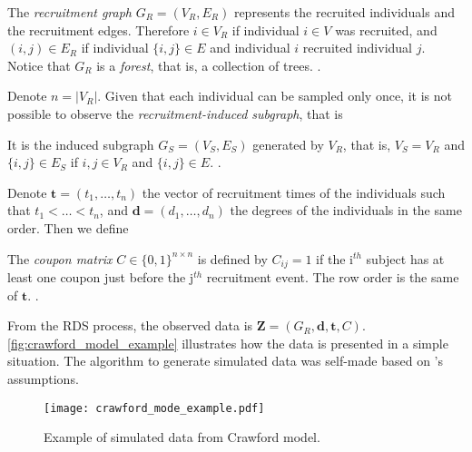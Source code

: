 \begin{definition}
  \label{def:recruitment-graph}
  The {\em recruitment graph} $G_R = (V_R, E_R)$ represents the recruited
  individuals and the recruitment edges. Therefore $i \in V_R$ if individual
  $i \in V$ was recruited, and $(i,j) \in E_R$ if individual $\{i,j\} \in E$ 
  and individual $i$ recruited individual $j$. Notice that $G_R$ is a {\em
  forest}, that is, a collection of trees. \cite[p. 193]{crawford2016}.
\end{definition}

Denote $n = |V_R|$. Given that each individual can be sampled only once, it is not possible to
observe the {\em recruitment-induced subgraph}, that is

\begin{definition}
  It is the induced subgraph $G_S = (V_S, E_S)$ generated by $V_R$, that is,
  $V_S = V_R$ and $\{i,j\} \in E_S$ if $i, j \in V_R$ and $\{i, j\} \in E$. 
  \cite[p. 192]{crawford2016}.
\end{definition}

Denote $\boldsymbol{t} = (t_1, \dots, t_n)$ the vector of recruitment times of
the individuals such that $t_1 < \dots < t_n$, and $\boldsymbol{d} = (d_1,
\dots, d_n)$ the degrees of the individuals in the same order. Then we define 

\begin{definition}
  The {\em coupon matrix} $C \in \{0,1\}^{n\times n}$ is defined by $C_{ij} =
1$ if the i$^{th}$ subject has at least one coupon just before the j$^{th}$
recruitment event. The row order is the same of $\boldsymbol{t}$. \cite[p.
193]{crawford2016}. 
\end{definition}

From the RDS process, the observed data is $\boldsymbol{Z} = (G_R,
\boldsymbol{d}, \boldsymbol{t}, C)$. \autoref{fig:crawford_model_example}
illustrates how the data is presented in a simple situation. The algorithm to
generate simulated data was self-made based on \textcite{crawford2016}'s assumptions.

\begin{figure}
  \centering
  \caption{\label{fig:crawford_model_example}Example of simulated data from
  Crawford model.}
  \texttt{[image: crawford\_mode\_example.pdf]}
\end{figure}

